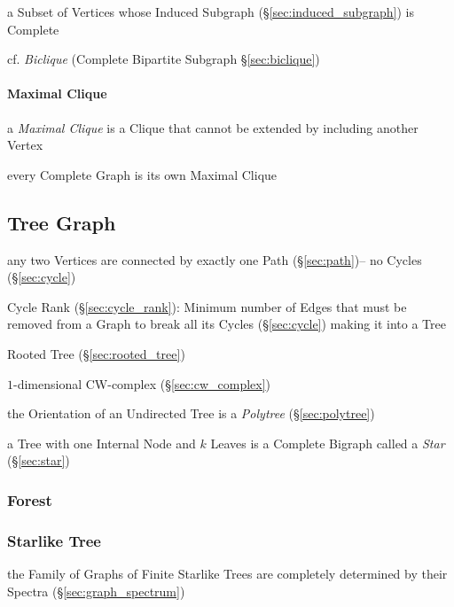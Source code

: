 a Subset of Vertices whose Induced Subgraph (\S\ref{sec:induced_subgraph}) is
Complete

cf. \emph{Biclique} (Complete Bipartite Subgraph \S\ref{sec:biclique})



\paragraph{Maximal Clique}\label{sec:maximal_clique}\hfill

a \emph{Maximal Clique} is a Clique that cannot be extended by including
another Vertex

every Complete Graph is its own Maximal Clique



\subsection{Tree Graph}\label{sec:tree_graph}

any two Vertices are connected by exactly one Path (\S\ref{sec:path})-- no
Cycles (\S\ref{sec:cycle})

Cycle Rank (\S\ref{sec:cycle_rank}): Minimum number of Edges that must be
removed from a Graph to break all its Cycles (\S\ref{sec:cycle}) making it into
a Tree

Rooted Tree (\S\ref{sec:rooted_tree})

$1$-dimensional CW-complex (\S\ref{sec:cw_complex})

the Orientation of an Undirected Tree is a \emph{Polytree}
(\S\ref{sec:polytree})

a Tree with one Internal Node and $k$ Leaves is a Complete Bigraph called a
\emph{Star} (\S\ref{sec:star})



\subsubsection{Forest}\label{sec:forest}

\subsubsection{Starlike Tree}\label{sec:starlike_tree}

the Family of Graphs of Finite Starlike Trees are completely determined by
their Spectra (\S\ref{sec:graph_spectrum})



